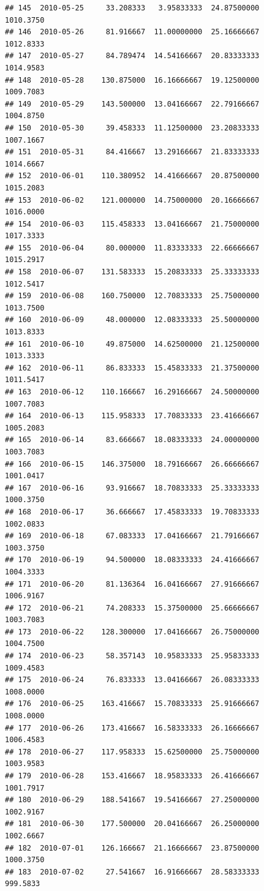 \documentclass[
]{article}
\begin{document}
\begin{verbatim}
## 145  2010-05-25     33.208333   3.95833333  24.87500000    1010.3750
## 146  2010-05-26     81.916667  11.00000000  25.16666667    1012.8333
## 147  2010-05-27     84.789474  14.54166667  20.83333333    1014.9583
## 148  2010-05-28    130.875000  16.16666667  19.12500000    1009.7083
## 149  2010-05-29    143.500000  13.04166667  22.79166667    1004.8750
## 150  2010-05-30     39.458333  11.12500000  23.20833333    1007.1667
## 151  2010-05-31     84.416667  13.29166667  21.83333333    1014.6667
## 152  2010-06-01    110.380952  14.41666667  20.87500000    1015.2083
## 153  2010-06-02    121.000000  14.75000000  20.16666667    1016.0000
## 154  2010-06-03    115.458333  13.04166667  21.75000000    1017.3333
## 155  2010-06-04     80.000000  11.83333333  22.66666667    1015.2917
## 158  2010-06-07    131.583333  15.20833333  25.33333333    1012.5417
## 159  2010-06-08    160.750000  12.70833333  25.75000000    1013.7500
## 160  2010-06-09     48.000000  12.08333333  25.50000000    1013.8333
## 161  2010-06-10     49.875000  14.62500000  21.12500000    1013.3333
## 162  2010-06-11     86.833333  15.45833333  21.37500000    1011.5417
## 163  2010-06-12    110.166667  16.29166667  24.50000000    1007.7083
## 164  2010-06-13    115.958333  17.70833333  23.41666667    1005.2083
## 165  2010-06-14     83.666667  18.08333333  24.00000000    1003.7083
## 166  2010-06-15    146.375000  18.79166667  26.66666667    1001.0417
## 167  2010-06-16     93.916667  18.70833333  25.33333333    1000.3750
## 168  2010-06-17     36.666667  17.45833333  19.70833333    1002.0833
## 169  2010-06-18     67.083333  17.04166667  21.79166667    1003.3750
## 170  2010-06-19     94.500000  18.08333333  24.41666667    1004.3333
## 171  2010-06-20     81.136364  16.04166667  27.91666667    1006.9167
## 172  2010-06-21     74.208333  15.37500000  25.66666667    1003.7083
## 173  2010-06-22    128.300000  17.04166667  26.75000000    1004.7500
## 174  2010-06-23     58.357143  10.95833333  25.95833333    1009.4583
## 175  2010-06-24     76.833333  13.04166667  26.08333333    1008.0000
## 176  2010-06-25    163.416667  15.70833333  25.91666667    1008.0000
## 177  2010-06-26    173.416667  16.58333333  26.16666667    1006.4583
## 178  2010-06-27    117.958333  15.62500000  25.75000000    1003.9583
## 179  2010-06-28    153.416667  18.95833333  26.41666667    1001.7917
## 180  2010-06-29    188.541667  19.54166667  27.25000000    1002.9167
## 181  2010-06-30    177.500000  20.04166667  26.25000000    1002.6667
## 182  2010-07-01    126.166667  21.16666667  23.87500000    1000.3750
## 183  2010-07-02     27.541667  16.91666667  28.58333333     999.5833

\end{verbatim}
\end{document}
